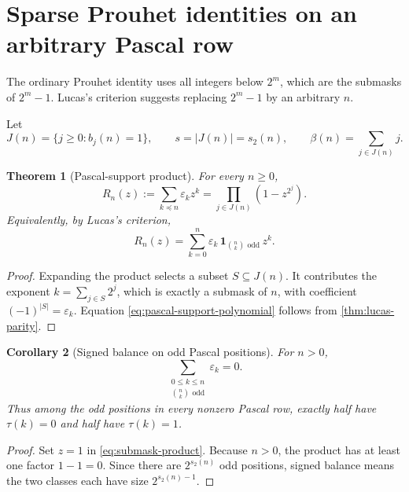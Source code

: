 \documentclass[11pt,oneside]{article}
\newtheorem{theorem}{Theorem}[section]
\newtheorem{corollary}[theorem]{Corollary}
\theoremstyle{definition}
\theoremstyle{remark}
\newcommand{\swt}{s_2}
\newcommand{\eps}{\varepsilon}
\newcommand{\submask}{\preccurlyeq}
\newcommand{\1}{\mathbf 1}
\begin{document}
\section{Sparse Prouhet identities on an arbitrary Pascal row}
\label{sec:sparse}

The ordinary Prouhet identity uses all integers below \(2^m\), which are the submasks of
\(2^m-1\).  Lucas's criterion suggests replacing \(2^m-1\) by an arbitrary \(n\).

Let
\begin{equation}
 J(n)=\{j\ge0:b_j(n)=1\},
 \qquad
 s=|J(n)|=\swt(n),
 \qquad
 \beta(n)=\sum_{j\in J(n)}j.
 \label{eq:J-beta}
\end{equation}

\begin{theorem}[Pascal-support product]
\label{thm:submask-product}
For every \(n\ge0\),
\begin{equation}
 \boxed{
 R_n(z):=\sum_{k\submask n}\eps_kz^k
 =\prod_{j\in J(n)}(1-z^{2^j}).}
 \label{eq:submask-product}
\end{equation}
Equivalently, by Lucas's criterion,
\begin{equation}
 R_n(z)=\sum_{k=0}^{n}
 \eps_k\,\1_{\binom nk\text{ odd}}\,z^k.
 \label{eq:pascal-support-polynomial}
\end{equation}
\end{theorem}

\begin{proof}
Expanding the product selects a subset \(S\subseteq J(n)\).  It contributes the exponent
\(k=\sum_{j\in S}2^j\), which is exactly a submask of \(n\), with coefficient
\((-1)^{|S|}=\eps_k\).  Equation \eqref{eq:pascal-support-polynomial} follows from
\cref{thm:lucas-parity}.
\end{proof}

\begin{corollary}[Signed balance on odd Pascal positions]
\label{cor:pascal-balance}
For \(n>0\),
\begin{equation}
 \boxed{
 \sum_{\substack{0\le k\le n\\ \binom nk\text{ odd}}}\eps_k=0.}
 \label{eq:pascal-balance}
\end{equation}
Thus among the odd positions in every nonzero Pascal row, exactly half have \(\tau(k)=0\) and
half have \(\tau(k)=1\).
\end{corollary}

\begin{proof}
Set \(z=1\) in \eqref{eq:submask-product}.  Because \(n>0\), the product has at least one
factor \(1-1=0\).  Since there are \(2^{\swt(n)}\) odd positions, signed balance means the two
classes each have size \(2^{\swt(n)-1}\).
\end{proof}
\end{document}
